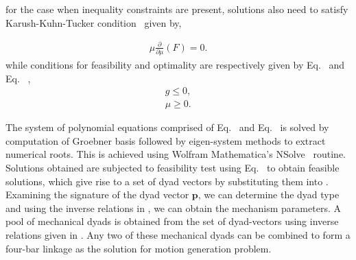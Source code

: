 for the case when inequality constraints are present, solutions also need to satisfy Karush-Kuhn-Tucker condition~\cite{Boyd2004} given by,

\begin{eqnarray}\label{kkt1}
\mu\frac{\partial}{\partial \mu}(F) = 0.
\end{eqnarray}
while conditions for feasibility and optimality are respectively given by Eq.~ and Eq.~ ,
 \begin{eqnarray}
 g \leq 0,\label{kkt2} \\
 \mu \geq 0.\label{kkt3}
\end{eqnarray}

The system of polynomial equations comprised of Eq.~ and Eq.~ is solved by computation of Groebner basis followed by eigen-system methods to extract numerical roots. This is achieved using Wolfram Mathematica's  NSolve~\cite{mathematica2016} routine. Solutions obtained are subjected to feasibility test using Eq.~   to obtain feasible solutions, which give rise to a set of dyad vectors by substituting them into . Examining the signature of the dyad vector $\textbf{p}$, we can determine the dyad type and using the inverse relations in , we can obtain the mechanism parameters. A pool of mechanical dyads is obtained from the set of dyad-vectors using inverse relations given in . Any two of these mechanical dyads can be combined to form a four-bar linkage as the solution for motion generation problem.

